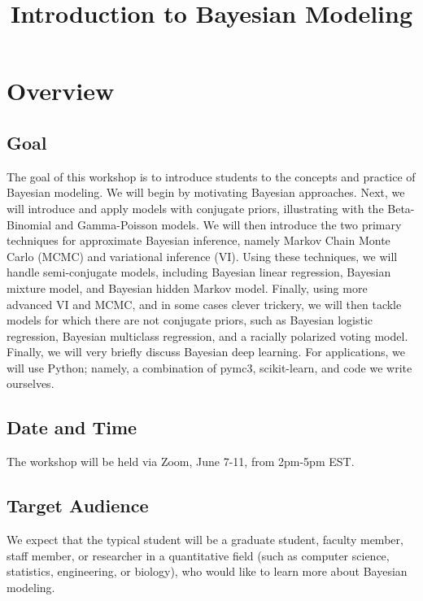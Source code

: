\documentclass{article} %
\begin{document}
\title{Introduction to Bayesian Modeling} 

\maketitle

\tableofcontents
\newpage

\section{Overview}

\subsection{Goal}  The goal of this workshop is to introduce students to the concepts and practice of Bayesian modeling.   We will begin by motivating Bayesian approaches.  Next,  we will introduce and apply models with conjugate priors,  illustrating with the Beta-Binomial and Gamma-Poisson models.   We will then introduce the two primary techniques for approximate Bayesian inference,  namely Markov Chain Monte Carlo (MCMC) and variational inference (VI).  Using these techniques, we will handle semi-conjugate models, including Bayesian linear regression, Bayesian mixture model,  and Bayesian hidden Markov model.   Finally, using more advanced VI and MCMC,  and in some cases clever trickery,  we will then tackle models for which there are not conjugate priors,  such as Bayesian logistic regression, Bayesian multiclass regression, and a racially polarized voting model.   Finally,  we will very briefly discuss Bayesian deep learning.    For applications,  we will use Python; namely,  a combination of  pymc3,  scikit-learn,  and code we write ourselves.  
 
\subsection{Date and Time}  The workshop will be held via Zoom,  June 7-11,  from 2pm-5pm EST.   
 
\subsection{Target Audience}  We expect that the typical student will be a graduate student, faculty member, staff member, or researcher in a quantitative field (such as computer science,  statistics,  engineering, or biology),  who would like to learn more about Bayesian modeling.  
\end{document}
